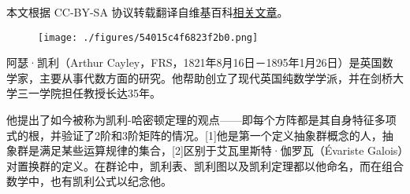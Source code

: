 
本文根据 CC-BY-SA 协议转载翻译自维基百科\href{https://en.wikipedia.org/wiki/Arthur_Cayley}{相关文章}。

\begin{figure}[ht]
\centering
\texttt{[image: ./figures/54015c4f6823f2b0.png]}
\caption{} \label{fig_Cayley_1}
\end{figure}
阿瑟·凯利（Arthur Cayley，FRS，1821年8月16日－1895年1月26日）是英国数学家，主要从事代数方面的研究。他帮助创立了现代英国纯数学学派，并在剑桥大学三一学院担任教授长达35年。

他提出了如今被称为凯利-哈密顿定理的观点——即每个方阵都是其自身特征多项式的根，并验证了2阶和3阶矩阵的情况。[1]他是第一个定义抽象群概念的人，抽象群是满足某些运算规律的集合，[2]区别于艾瓦里斯特·伽罗瓦（Évariste Galois）对置换群的定义。在群论中，凯利表、凯利图以及凯利定理都以他命名，而在组合数学中，也有凯利公式以纪念他。
